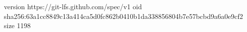 version https://git-lfs.github.com/spec/v1
oid sha256:63a1cc8849c13a414ca5d0fc862b0410b1da338856804b7e57bcbd9a6a0e9cf2
size 1198
